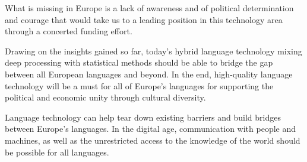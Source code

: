\documentclass[10pt, plain]{../../metanetpaper}
\begin{document}
\begin{multicols}{2}
What is missing in Europe is a lack of awareness and of political determination and courage that would take us to a leading position in this technology area through a concerted funding effort.

Drawing on the insights gained so far, today’s hybrid language technology mixing deep processing with statistical methods should be able to bridge the gap between all European languages and beyond. In the end, high-quality language technology will be a must for all of Europe's languages for supporting the political and economic unity through cultural diversity.

Language technology can help tear down existing barriers and build bridges between Europe’s languages. In the digital age, communication with people and machines, as well as the unrestricted access to the knowledge of the world should be possible for all languages.
\end{multicols}

\clearpage


\end{document}
